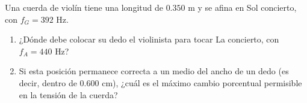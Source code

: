 \item Una cuerda de violín tiene una longitud de $0.350\text{ m}$ y se afina en Sol concierto, con $f_G = 392\text{ Hz}$.
\begin{enumerate}
    \item ¿Dónde debe colocar su dedo el violinista para tocar La concierto, con $f_A = 440\text{ Hz}$?
    \item Si esta posición permanece correcta a un medio del ancho de un dedo (es decir, dentro de $0.600\text{ cm}$), ¿cuál es el máximo cambio porcentual permisible en la tensión de la cuerda?
\end{enumerate}